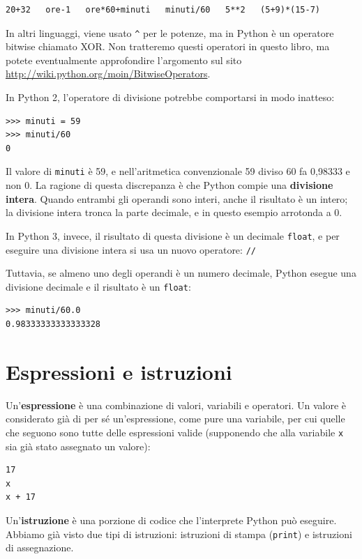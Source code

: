 \documentclass[10pt]{book}
\begin{document}
\begin{verbatim}
20+32   ore-1   ore*60+minuti   minuti/60   5**2   (5+9)*(15-7)
\end{verbatim}
%
In altri linguaggi, viene usato \verb"^" per le potenze, ma in Python è un operatore bitwise chiamato XOR. Non tratteremo questi operatori in questo libro, ma potete eventualmente approfondire l'argomento sul sito \url{http://wiki.python.org/moin/BitwiseOperators}.

In Python 2, l'operatore di divisione potrebbe comportarsi in modo inatteso:

\begin{verbatim}
>>> minuti = 59
>>> minuti/60
0
\end{verbatim}
%
Il valore di {\tt minuti} è 59, e nell'aritmetica convenzionale 59 diviso 60 fa 0,98333 e non 0. La ragione di questa discrepanza è che Python compie una {\bf divisione intera}. Quando entrambi gli operandi sono interi, anche il risultato è un intero; la divisione intera tronca la parte decimale, e in questo esempio arrotonda a 0.

In Python 3, invece, il risultato di questa divisione è un decimale {\tt float}, e per eseguire una divisione intera si usa un nuovo operatore: {\tt //}

Tuttavia, se almeno uno degli operandi è un numero decimale, Python esegue una divisione decimale e il risultato è un {\tt float}:

\begin{verbatim}
>>> minuti/60.0
0.98333333333333328
\end{verbatim}


\section{Espressioni e istruzioni}

Un'{\bf espressione} è una combinazione di valori, variabili e operatori. Un valore è considerato già di per sé un'espressione, come pure una variabile, per cui quelle che seguono sono tutte delle espressioni valide (supponendo che alla variabile {\tt x} sia già stato assegnato un valore):

\begin{verbatim}
17
x
x + 17
\end{verbatim}
%
Un'{\bf istruzione} è una porzione di codice che l'interprete Python può eseguire. Abbiamo già visto due tipi di istruzioni: istruzioni di stampa ({\tt print}) e istruzioni di assegnazione.
\end{document}
